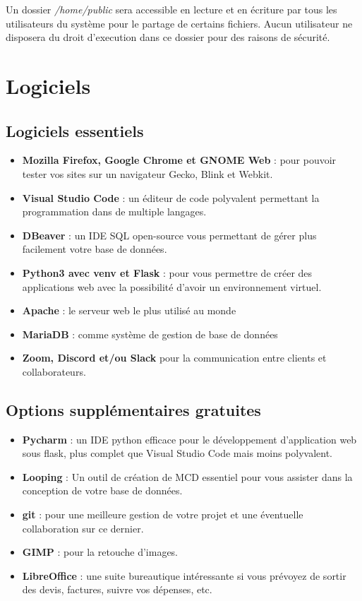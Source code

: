 Un dossier \textit{/home/public} sera accessible en lecture et en écriture par tous les utilisateurs du système pour le partage de certains fichiers. Aucun utilisateur ne disposera du droit d'execution dans ce dossier pour des raisons de sécurité.

\section{Logiciels}

\subsection{Logiciels essentiels}

\begin{itemize}
	\item \textbf{Mozilla Firefox, Google Chrome et GNOME Web} : pour pouvoir tester vos sites sur un navigateur Gecko, Blink et Webkit.
	\item \textbf{Visual Studio Code} : un éditeur de code polyvalent permettant la programmation dans de multiple langages.
	\item \textbf{DBeaver} : un IDE SQL open-source vous permettant de gérer plus facilement votre base de données.
	\item \textbf{Python3 avec venv et Flask} : pour vous permettre de créer des applications web avec la possibilité d'avoir un environnement virtuel.
	\item \textbf{Apache} : le serveur web le plus utilisé au monde 
	\item \textbf{MariaDB} : comme système de gestion de base de données
	\item \textbf{Zoom, Discord et/ou Slack} pour la communication entre clients et collaborateurs.
\end{itemize}

\subsection{Options supplémentaires gratuites}

\begin{itemize}
	\item \textbf{Pycharm} : un IDE python efficace pour le développement d'application web sous flask, plus complet que Visual Studio Code mais moins polyvalent.
	\item \textbf{Looping} : Un outil de création de MCD essentiel pour vous assister dans la conception de votre base de données.
	\item \textbf{git} : pour une meilleure gestion de votre projet et une éventuelle collaboration sur ce dernier.
	\item \textbf{GIMP} : pour la retouche d'images.
	\item \textbf{LibreOffice} : une suite bureautique intéressante si vous prévoyez de sortir des devis, factures, suivre vos dépenses, etc.
\end{itemize}


